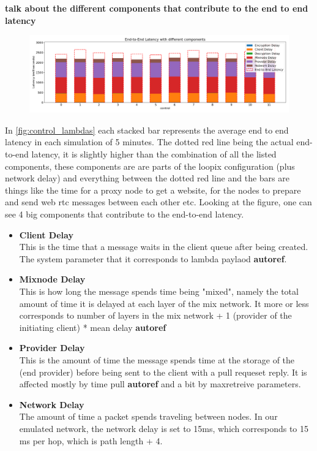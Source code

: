 \documentclass[a4paper,11pt,oneside]{report}
\begin{document}
\textbf{talk about the different components that contribute to the end to end latency}

\begin{figure}[htbp]
    \centering
    \includegraphics[width=\textwidth]{plots/control_latency_components.png}
    \caption{}
    \label{fig:control_lambdas}
\end{figure}

In \autoref{fig:control_lambdas} each stacked bar represents the average end to end latency in each simulation of 5 minutes. The dotted red line being the actual end-to-end latency, it is slightly higher than the combination of all the listed components, these components are are parts of the loopix configuration (plus network delay) and everything between the dotted red line and the bars are things like the time for a proxy node to get a website, for the nodes to prepare and send web rtc messages between each other etc. Looking at the figure, one can see 4 big components that contribute to the end-to-end latency.

\begin{itemize}
    \item \textbf{Client Delay} \\
    This is the time that a message waits in the client queue after being created. The system parameter that it corresponds  to lambda paylaod \textbf{autoref{}}. 
    \item \textbf{Mixnode Delay} \\
    This is how long the message spends time being "mixed", namely the total amount of time it is delayed at each layer of the mix network. It more or less corresponds to number of layers in the mix network + 1 (provider of the initiating client) * mean delay \textbf{autoref}
    \item \textbf{Provider Delay} \\
    This is the amount of time the message spends time at the storage of the (end provider) before being sent to the client with a pull requeset reply. It is affected mostly by time pull \textbf{autoref} and a bit by maxretreive parameters.
    \item \textbf{Network Delay} \\
    The amount of time a packet spends traveling between nodes. In our emulated network, the network delay is set to 15ms, which corresponds to 15 ms per hop, which is path length + 4. 
\end{itemize}
\end{document}
